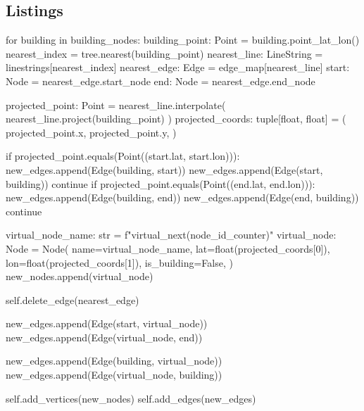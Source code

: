 \subsection{Listings}
\begin{python}[caption={The algorithm to connect the buildings to the road network}, label={lst:python-edges}]
for building in building_nodes:
    building_point: Point = building.point_lat_lon()
    nearest_index = tree.nearest(building_point)
    nearest_line: LineString = linestrings[nearest_index]
    nearest_edge: Edge = edge_map[nearest_line]
    start: Node = nearest_edge.start_node
    end: Node = nearest_edge.end_node

    projected_point: Point = nearest_line.interpolate(
        nearest_line.project(building_point)
    )
    projected_coords: tuple[float, float] = (
        projected_point.x,
        projected_point.y,
    )

    if projected_point.equals(Point((start.lat, start.lon))):
        new_edges.append(Edge(building, start))
        new_edges.append(Edge(start, building))
        continue
    if projected_point.equals(Point((end.lat, end.lon))):
        new_edges.append(Edge(building, end))
        new_edges.append(Edge(end, building))
        continue

    virtual_node_name: str = 
        f"virtual_{next(node_id_counter)}"
    virtual_node: Node = Node(
        name=virtual_node_name,
        lat=float(projected_coords[0]),
        lon=float(projected_coords[1]),
        is_building=False,
    )
    new_nodes.append(virtual_node)

    self.delete_edge(nearest_edge)

    new_edges.append(Edge(start, virtual_node))
    new_edges.append(Edge(virtual_node, end))

    new_edges.append(Edge(building, virtual_node))
    new_edges.append(Edge(virtual_node, building))

self.add_vertices(new_nodes)
self.add_edges(new_edges)
\end{python}

